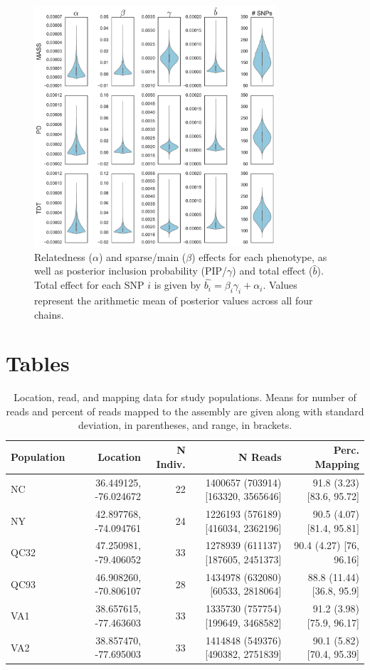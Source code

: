 \documentclass[smallextended]{svjour3}
\begin{document}
\begin{figure}[ht]
\centering
\includegraphics[width=0.8\textwidth]{gemma_effect}
\caption{Relatedness ($\alpha$) and sparse/main ($\beta$) effects for each
phenotype, as well 
as posterior inclusion probability (PIP/$\gamma$) and total effect ($\hat{b}$).
Total effect for 
each SNP $i$ is given by $\hat{b_i} = \beta_i\gamma_i + \alpha_i$. Values
represent the arithmetic 
mean of posterior values across all four chains.}
\label{fig:gemma_effect}
\end{figure}
\clearpage

\section*{Tables}

\begin{longtable}[]{@{}lrrrr@{}}
\caption{Location, read, and mapping data for study populations. Means for
number of reads and 
percent of reads mapped to the assembly are given along with standard
deviation, in parentheses, and 
range, in brackets.}\\
\toprule
Population & Location & N Indiv. & N Reads & Perc.
Mapping\tabularnewline
\midrule
\endhead
NC & 36.449125, -76.024672 & 22 & \num{1400657} (\num{703914}) {[}\num{163320},
\num{3565646}{]}
& 91.8 (3.23) {[}83.6, 95.72{]}\tabularnewline
NY & 42.897768, -74.094761 & 24 & \num{1226193} (\num{576189}) {[}\num{416034},
\num{2362196}{]}
& 90.5 (4.07) {[}81.4, 95.81{]}\tabularnewline
QC32 & 47.250981, -79.406052 & 33 & \num{1278939} (\num{611137})
{[}\num{187605},
\num{2451373}{]} & 90.4 (4.27) {[}76, 96.16{]}\tabularnewline
QC93 & 46.908260, -70.806107 & 28 & \num{1434978} (\num{632080})
{[}\num{60533}, \num{2818064}{]}
& 88.8 (11.44) {[}36.8, 95.9{]}\tabularnewline
VA1 & 38.657615, -77.463603 & 33 & \num{1335730} (\num{757754})
{[}\num{199649},
\num{3468582}{]} & 91.2 (3.98) {[}75.9, 96.17{]}\tabularnewline
VA2 & 38.857470, -77.695003 & 33 & \num{1414848} (\num{549376})
{[}\num{490382}, \num{2751839}{]}
& 90.1 (5.82) {[}70.4, 95.39{]}\tabularnewline
\bottomrule
\end{longtable}
\end{document}
